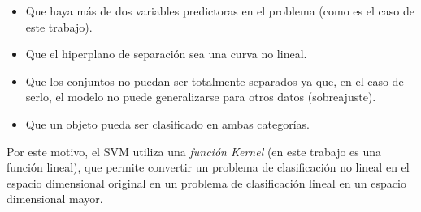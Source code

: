 \begin{itemize}
	\item Que haya más de dos variables predictoras en el problema (como es el caso de este trabajo).
	\item Que el hiperplano de separación sea una curva no lineal.
	\item Que los conjuntos no puedan ser totalmente separados ya que, en el caso de serlo, el modelo no puede generalizarse para otros datos (sobreajuste).
	\item Que un objeto pueda ser clasificado en ambas categorías.
\end{itemize}

Por este motivo, el SVM utiliza una \textit{función Kernel} (en este trabajo es una función lineal), que permite convertir un problema de clasificación no lineal en el espacio dimensional original en un problema de clasificación lineal en un espacio dimensional mayor.

